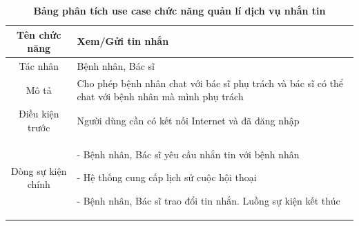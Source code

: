   \begin{table}[H]
    \caption{\bfseries \fontsize{12pt}{0pt}\selectfont Bảng phân tích use case chức năng quản lí dịch vụ nhắn tin}
    \centering
    \begin{tabularx}{0.9\textwidth}{|c|X|}
      \hline
      \textbf{Tên chức năng} & \textbf{Xem/Gửi tin nhắn} \\
      \hline
      Tác nhân & Bệnh nhân, Bác sĩ \\
      \hline
      Mô tả & Cho phép bệnh nhân chat với bác sĩ phụ trách và bác sĩ có thể chat với bệnh nhân mà mình phụ trách \\
      \hline
      Điều kiện trước & Người dùng cần có kết nối Internet và đã đăng nhập \\
      \hline
      Dòng sự kiện chính & 
        - Bệnh nhân, Bác sĩ yêu cầu nhắn tin với bệnh nhân

        - Hệ thống cung cấp lịch sử cuộc hội thoại

        - Bệnh nhân, Bác sĩ trao đổi tin nhắn. Luồng sự kiện kết thúc
        \\
      \hline
    \end{tabularx}
  \end{table}

